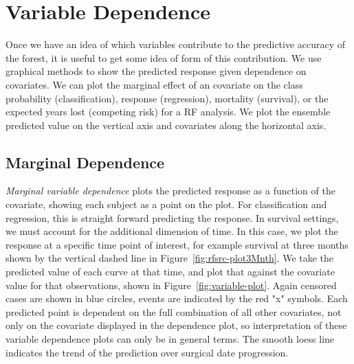 \documentclass[nojss]{jss}\usepackage[]{graphicx}\usepackage[]{color}
\begin{document}
\section{Variable Dependence}\label{S:dependence}
Once we have an idea of which variables contribute to the predictive accuracy of the forest, it is useful to get some idea of form of this contribution. We use graphical methods to show the predicted response given dependence on covariates. We can plot the marginal effect of an covariate on the class probability (classification), response (regression), mortality (survival), or the expected years lost (competing risk) for a RF analysis. We plot the ensemble predicted value on the vertical axis and covariates along the horizontal axis.

\subsection{Marginal Dependence}\label{S:variableDependence}
\emph{Marginal variable dependence} plots the predicted response as a function of the covariate, showing each subject as a point on the plot. For classification and regression, this is straight forward predicting the response. In survival settings, we must account for the additional dimension of time. In this case, we plot the response at a specific time point of interest, for example survival at three months shown by the vertical dashed line in Figure~\ref{fig:rfsrc-plot3Mnth}. We take the predicted value of each curve at that time, and plot that against the covariate value for that observations, shown in Figure~\ref{fig:variable-plot}. Again censored cases are shown in blue circles, events are indicated by the red "x" symbols. Each predicted point is dependent on the full combination of all other covariates, not only on the covariate displayed in the dependence plot, so interpretation of these variable dependence plots can only be in general terms. The smooth loess line~\citep{cleveland:1981, cleveland:1988} indicates the trend of the prediction over surgical date progression.
\end{document}

